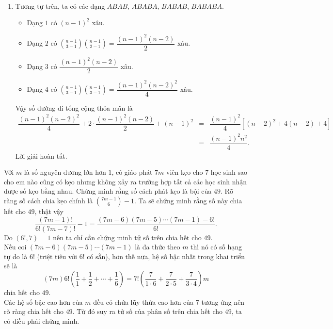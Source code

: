 \begin{bt}
{\begin{enumerate}
			\item Tương tự trên, ta có các dạng $ABAB$, $ABABA$, $BABAB$, $BABABA$.
			\begin{itemize}
				\item Dạng $1$ có $\left( n-1 \right)^2$ xâu.
				\item Dạng $2$ có $\displaystyle {n-1 \choose 3-1}{n-1 \choose 2-1}=\dfrac{\left( n-1 \right)^2 \left( n-2 \right)}{2}$ xâu.
				\item Dạng $3$ có $\dfrac{\left( n-1 \right)^2\left( n-2 \right)}{2}$ xâu.
				\item Dạng $4$ có $\displaystyle {n-1 \choose 3-1}{n-1 \choose 3-1}=\dfrac{\left( n-1 \right)^2 \left( n-2 \right)^2}{4}$ xâu.
			\end{itemize}
			Vậy số đường đi tổng cộng thỏa mãn là
			\begin{eqnarray*}
			 \dfrac{(n-1)^2 (n-2)^2}{4}+2\cdot \dfrac{(n-1)^2(n-2)}{2}+(n-1)^2 & = & \dfrac{(n-1)^2}{4}\left[(n-2)^2+4(n-2)+4 \right]\\
			 & = & \dfrac{\left( n-1 \right)^2n^2}{4}.
			\end{eqnarray*}
			Lời giải hoàn tất.
		\end{enumerate}
	}
\end{bt}

\begin{bt}%
 Với $m$ là số nguyên dương lớn hơn $1$, cô giáo phát $7m$ viên kẹo cho $7$ học sinh sao cho em nào cũng có kẹo nhưng không xảy ra trường hợp tất cả các học sinh nhận được số kẹo bằng nhau. Chứng minh rằng số cách phát kẹo là bội của $49$.
 \loigiai
 {Rõ ràng số cách chia kẹo chính là $\displaystyle {7m-1 \choose 6} -1$. Ta sẽ chứng minh rằng số này chia hết cho $49$, thật vậy
			\[\dfrac{\left( 7m-1 \right)!}{6!\left( 7m-7 \right)!}-1=\dfrac{\left( 7m-6 \right)\left( 7m-5 \right)\cdots \left( 7m-1 \right)-6!}{6!}.\]
			Do $\left( 6!,7 \right)=1$ nên ta chỉ cần chứng minh tử số trên chia hết cho $49$.\\
			Nếu coi $\left( 7m-6 \right)\left( 7m-5 \right)\cdots \left( 7m-1 \right)$ là đa thức theo $m$ thì nó có số hạng tự do là $6!$ (triệt tiêu với $6!$ có sẵn), hơn thế nữa, hệ số bậc nhất trong khai triển sẽ là
			\[\left( 7m \right)6!\left( \dfrac{1}{1}+\dfrac{1}{2}+\cdots +\dfrac{1}{6} \right)=7!\left( \dfrac{7}{1 \cdot 6}+\dfrac{7}{2 \cdot 5}+\dfrac{7}{3 \cdot 4} \right)m\]
			chia hết cho $49$.\\
			Các hệ số bậc cao hơn của $m$ đều có chứa lũy thừa cao hơn của $7$ tương ứng nên rõ ràng chia hết cho $49$. Từ đó suy ra tử số của phân số trên chia hết cho $49$, ta có điều phải chứng minh.
	}
\end{bt}

